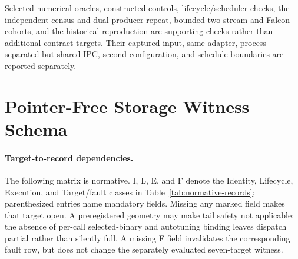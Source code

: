 \documentclass{article}
\begin{document}
Selected numerical oracles, constructed controls, lifecycle/scheduler checks,
the independent census and dual-producer repeat, bounded two-stream and Falcon
cohorts, and the historical reproduction are supporting checks rather than
additional contract targets.  Their captured-input, same-adapter,
process-separated-but-shared-IPC, second-configuration, and schedule boundaries
are reported separately.

\section{Pointer-Free Storage Witness Schema}
\label{app:storage-schema}

\paragraph{Target-to-record dependencies.}
The following matrix is normative.  I, L, E, and F denote the Identity,
Lifecycle, Execution, and Target/fault classes in Table~\ref{tab:normative-records};
parenthesized entries name mandatory fields.  Missing any marked field makes
that target open.  A preregistered geometry may make tail safety not applicable;
the absence of per-call selected-binary and autotuning binding leaves dispatch
partial rather than silently full.  A missing F field invalidates the corresponding fault row,
but does not change the separately evaluated seven-target witness.
\end{document}
